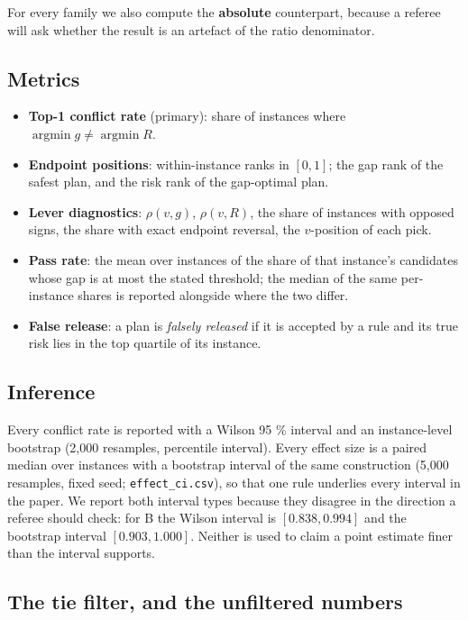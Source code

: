 \documentclass[preprint,12pt,letterpaper]{elsarticle}
\theoremstyle{definition}
\theoremstyle{plain}
\begin{document}
For every family we also compute the \textbf{absolute} counterpart, because a referee will ask whether the result is an artefact of the ratio denominator.

\subsection{Metrics}

\begin{itemize}
\item \textbf{Top-1 conflict rate} (primary): share of instances where $\operatorname{argmin} g \neq \operatorname{argmin} R$.
\item \textbf{Endpoint positions}: within-instance ranks in $[0,1]$; the gap rank of the safest plan, and the risk rank of the gap-optimal plan.
\item \textbf{Lever diagnostics}: $\rho(v, g)$, $\rho(v, R)$, the share of instances with opposed signs, the share with exact endpoint reversal, the $v$-position of each pick.
\item \textbf{Pass rate}: the mean over instances of the share of that instance's candidates whose gap is at most the stated threshold; the median of the same per-instance shares is reported alongside where the two differ.
\item \textbf{False release}: a plan is \textit{falsely released} if it is accepted by a rule and its true risk lies in the top quartile of its instance.
\end{itemize}

\subsection{Inference}

Every conflict rate is reported with a Wilson 95 \% interval and an instance-level bootstrap (2,000 resamples, percentile interval). Every effect size is a paired median over instances with a bootstrap interval of the same construction (5,000 resamples, fixed seed; \texttt{effect\_\allowbreak{}ci.\allowbreak{}csv}), so that one rule underlies every interval in the paper. We report both interval types because they disagree in the direction a referee should check: for B the Wilson interval is $[0.838, 0.994]$ and the bootstrap interval $[0.903, 1.000]$. Neither is used to claim a point estimate finer than the interval supports.

\subsection{The tie filter, and the unfiltered numbers}
\end{document}
